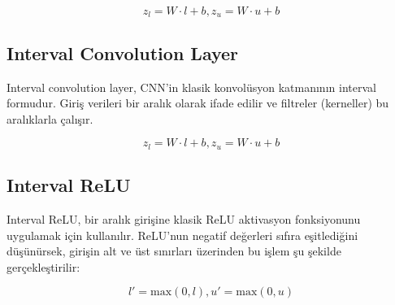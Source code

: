 \[ z_l = W \cdot l + b, z_u = W \cdot u + b \]

\subsection{Interval Convolution Layer}

Interval convolution layer, CNN'in klasik konvolüsyon katmanının interval formudur. Giriş verileri bir aralık olarak ifade edilir ve filtreler (kerneller) bu aralıklarla çalışır.

\[ z_l = W \cdot l + b, z_u = W \cdot u + b \]

\subsection{Interval ReLU}

Interval ReLU, bir aralık girişine klasik ReLU aktivasyon fonksiyonunu uygulamak için kullanılır. ReLU'nun negatif değerleri sıfıra eşitlediğini düşünürsek, girişin alt ve üst sınırları üzerinden bu işlem şu şekilde gerçekleştirilir:

\[ l' = \text{max}(0, l), u' = \text{max}(0, u) \]

\newpage